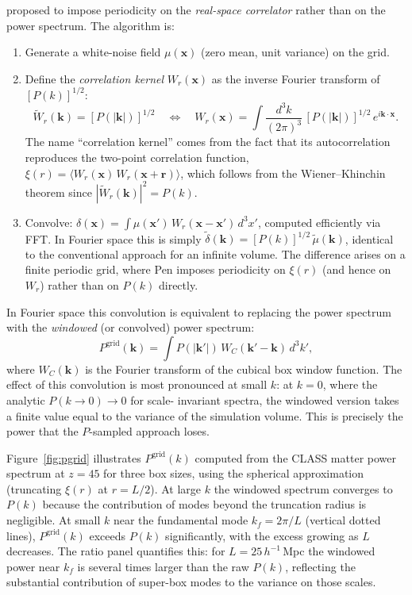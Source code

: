 \documentclass[12pt]{article}
\begin{document}
\citet{Pen1997} proposed to impose periodicity on the \emph{real-space
correlator} rather than on the power spectrum.  The algorithm is:
%
\begin{enumerate}
  \item Generate a white-noise field $\mu(\mathbf{x})$ (zero mean, unit
        variance) on the grid.
  \item Define the \emph{correlation kernel} $W_r(\mathbf{x})$ as the
        inverse Fourier transform of $[P(k)]^{1/2}$:
        \begin{equation}
          \tilde{W}_r(\mathbf{k}) = [P(|\mathbf{k}|)]^{1/2}
          \quad \Longleftrightarrow \quad
          W_r(\mathbf{x}) = \int \frac{d^3k}{(2\pi)^3}\,
          [P(|\mathbf{k}|)]^{1/2}\,e^{i\mathbf{k}\cdot\mathbf{x}}.
          \label{eq:corrkernel}
        \end{equation}
        The name ``correlation kernel'' comes from the fact that its
        autocorrelation reproduces the two-point correlation function,
        $\xi(r) = \langle W_r(\mathbf{x})\,W_r(\mathbf{x}+\mathbf{r})\rangle$,
        which follows from the Wiener--Khinchin theorem since
        $|\tilde{W}_r(\mathbf{k})|^2 = P(k)$.
  \item Convolve: $\delta(\mathbf{x}) = \int \mu(\mathbf{x}')\,
        W_r(\mathbf{x}-\mathbf{x}')\,d^3x'$,
        computed efficiently via FFT.  In Fourier space this is simply
        $\tilde{\delta}(\mathbf{k}) = [P(k)]^{1/2}\,\tilde{\mu}(\mathbf{k})$,
        identical to the conventional approach for an infinite volume.
        The difference arises on a finite periodic grid, where Pen
        imposes periodicity on $\xi(r)$ (and hence on $W_r$) rather
        than on $P(k)$ directly.
\end{enumerate}
%
In Fourier space this convolution is equivalent to replacing the power
spectrum with the \emph{windowed} (or convolved) power spectrum:
\begin{equation}
  P^\mathrm{grid}(\mathbf{k}) = \int P(|\mathbf{k}'|)\,
  W_C(\mathbf{k}'-\mathbf{k})\,d^3k',
  \label{eq:pgrid}
\end{equation}
where $W_C(\mathbf{k})$ is the Fourier transform of the cubical box
window function.  The effect of this convolution is most pronounced at
small $k$: at $k=0$, where the analytic $P(k\to 0) \to 0$ for scale-
invariant spectra, the windowed version takes a finite value equal to
the variance of the simulation volume.  This is precisely the power that
the $P$-sampled approach loses.

Figure~\ref{fig:pgrid} illustrates $P^\mathrm{grid}(k)$ computed from
the CLASS matter power spectrum at $z=45$ for three box sizes, using
the spherical approximation (truncating $\xi(r)$ at $r = L/2$).  At
large $k$ the windowed spectrum converges to $P(k)$ because the
contribution of modes beyond the truncation radius is negligible.  At
small $k$ near the fundamental mode $k_f = 2\pi/L$ (vertical dotted
lines), $P^\mathrm{grid}(k)$ exceeds $P(k)$ significantly, with the
excess growing as $L$ decreases.  The ratio panel quantifies this: for
$L = 25\,h^{-1}$\,Mpc the windowed power near $k_f$ is several times
larger than the raw $P(k)$, reflecting the substantial contribution
of super-box modes to the variance on those scales.
\end{document}
